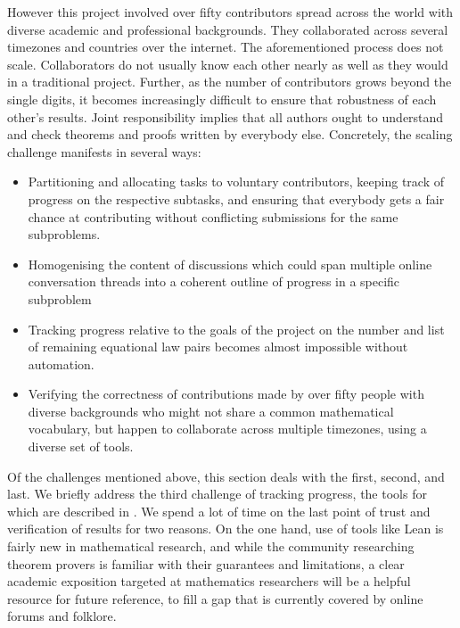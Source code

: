 However this project involved over fifty contributors spread across the world with diverse academic and professional backgrounds. They collaborated across several timezones and countries over the internet. The aforementioned process does not scale. Collaborators do not usually know each other nearly as well as they would in a traditional project. Further, as the number of contributors grows beyond the single digits, it becomes increasingly difficult to ensure that robustness of each other's results. Joint responsibility implies that all authors ought to understand and check theorems and proofs written by everybody else. Concretely, the scaling challenge manifests in several ways:
\begin{itemize}
    \item Partitioning and allocating tasks to voluntary contributors, keeping track of progress on the respective subtasks, and ensuring that everybody gets a fair chance at contributing without conflicting submissions for the same subproblems.
    \item Homogenising the content of discussions which could span multiple online conversation threads into a coherent outline of progress in a specific subproblem
    \item Tracking progress relative to the goals of the project on the number and list of remaining equational law pairs becomes almost impossible without automation.
    \item Verifying the correctness of contributions made by over fifty people with diverse backgrounds who might not share a common mathematical vocabulary, but happen to  collaborate across multiple timezones, using a diverse set of tools.
\end{itemize}

Of the challenges mentioned above, this section deals with the first, second, and last. We briefly address the third challenge of tracking progress, the tools for which are described in . We spend a lot of time on the last point of trust and verification of results for two reasons. On the one hand, use of tools like Lean is fairly new in mathematical research, and while the community researching theorem provers is familiar with their guarantees and limitations, a clear academic exposition targeted at mathematics researchers will be a helpful resource for future reference, to fill a gap that is currently covered by online forums and folklore.

